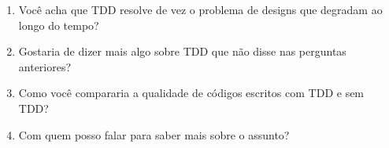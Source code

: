 \begin{enumerate}
	\item Você acha que TDD resolve de vez o problema de designs que degradam ao longo do tempo?

	\item Gostaria de dizer mais algo sobre TDD que não disse nas perguntas anteriores?
	
	\item Como você compararia a qualidade de códigos escritos com TDD e sem TDD? 

	\item Com quem posso falar para saber mais sobre o assunto?
\end{enumerate}
